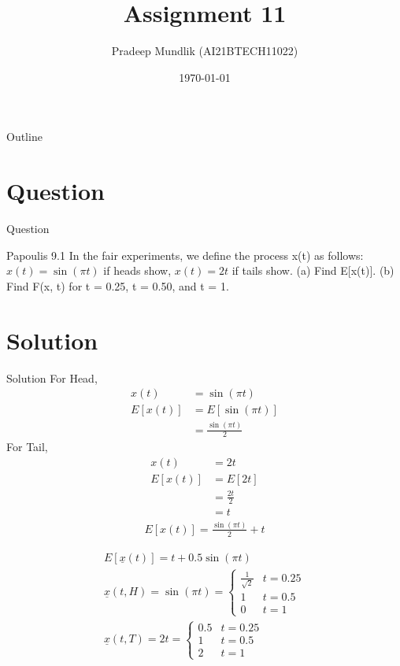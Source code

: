 \documentclass{beamer}
\title{Assignment 11}
\author{Pradeep Mundlik (AI21BTECH11022)}
\date{\today}
\begin{document}
\begin{frame}
    \titlepage 
\end{frame}



\begin{frame}{Outline}
    \tableofcontents
\end{frame}


\section{Question}
\begin{frame}{Question}
    \begin{block}{Papoulis 9.1}
        In the fair experiments, we define the process x(t) as follows: $x(t) = \sin(\pi t)$ if heads show, $x(t) = 2t$ if tails show. (a) Find E[x(t)]. (b) Find F(x, t) for t = 0.25, t = 0.50, and t = 1.
    \end{block} 
\end{frame}

\section{Solution}
\begin{frame}{Solution}
        For Head, 
        \begin{align}
            x(t) &= \sin(\pi t) \\
            E[x(t)] &= E[\sin(\pi t)] \\
                     &= \frac{\sin(\pi t)}{2}
        \end{align}
        For Tail, 
        \begin{align}
            x(t) &= 2t \\
            E[x(t)] &= E[2t] \\
                     &= \frac{2t}{2} \\
                     &= t
        \end{align}
        \begin{align}
            E[x(t)] = \frac{\sin(\pi t)}{2} + t
        \end{align}
\end{frame}
\begin{frame}
    \begin{align}
        E[\underline{x}(t)] = t + 0.5\sin(\pi t) \\
        \underline{x}(t, H) = \sin(\pi t) = 
        \begin{cases}
            \frac{1}{\sqrt{2}} & t = 0.25 \\
            1 & t = 0.5 \\
            0 & t = 1 
        \end{cases}\\
        \underline{x}(t, T) = 2t = 
        \begin{cases}
            0.5 & t = 0.25 \\
            1 & t = 0.5 \\
            2 & t = 1
        \end{cases}
    \end{align}
\end{frame}
\end{document}
